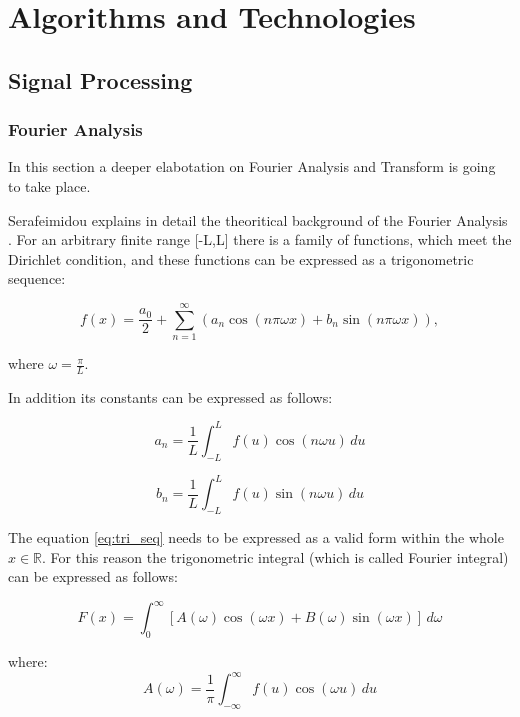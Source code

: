 \section{Algorithms and Technologies}
\subsection{Signal Processing}
\subsubsection{Fourier Analysis}
{
In this section a deeper elabotation on Fourier Analysis and Transform is going to take place. 

Serafeimidou explains in detail the theoritical background of the Fourier Analysis \cite{diff_eq}. For an arbitrary finite range [-L,L] there is a family of functions, which meet the Dirichlet condition, and these functions can be expressed as a trigonometric sequence: 

\begin{equation}
    f(x) = \frac{a_0}{2} + \sum_{n=1}^{\infty} \left( a_n \cos(n\pi \omega x) + b_n \sin(n\pi \omega x) \right),
    \label{eq:tri_seq}
\end{equation}

where \( \omega = \frac{\pi}{L} \).

In addition its constants can be expressed as follows:

\begin{equation}
    a_n = \frac{1}{L} \int_{-L}^{L} f(u) \cos(n \omega u) \,du   
\end{equation}

\begin{equation}
    b_n = \frac{1}{L} \int_{-L}^{L} f(u) \sin(n \omega u) \,du    
\end{equation}

The equation \eqref{eq:tri_seq} needs to be expressed as a valid form within the whole \( x \in \mathbb{R} \). For this reason the  trigonometric integral (which is called Fourier integral) can be expressed as follows: 

\begin{equation}
    F(x) = \int_0^{\infty} \left[ A(\omega) \cos(\omega x) + B(\omega) \sin(\omega x) \right] \, d\omega
    \label{eq:tri_int}
\end{equation}

where: 
\begin{equation}
    A(\omega) = \frac{1}{\pi} \int_{-\infty}^{\infty} f(u) \cos(\omega u) \,du
    \label{eq:Aomega}
\end{equation}

}
